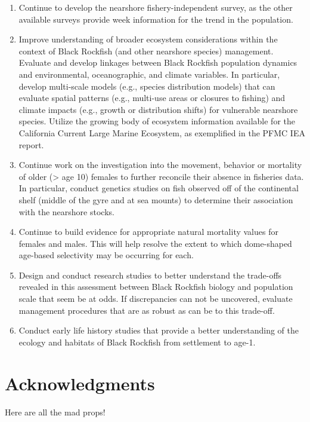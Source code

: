 \documentclass[11pt,
  english,
  letterpaper,
]{article}
\providecommand{\tightlist}{%
  \setlength{\itemsep}{0pt}\setlength{\parskip}{0pt}}
\providecommand{\tightlist}{%
  \setlength{\itemsep}{0pt}\setlength{\parskip}{0pt}}
\begin{document}
\begin{enumerate}
\def\labelenumi{\arabic{enumi}.}
\tightlist
\item
  Continue to develop the nearshore fishery-independent survey, as the other available surveys provide week information for the trend in the population.
\item
  Improve understanding of broader ecosystem considerations within the context of Black Rockfish (and other nearshore species) management. Evaluate and develop linkages between Black Rockfish population dynamics and environmental, oceanographic, and climate variables. In particular, develop multi-scale models (e.g., species distribution models) that can evaluate spatial patterns (e.g., multi-use areas or closures to fishing) and climate impacts (e.g., growth or distribution shifts) for vulnerable nearshore species. Utilize the growing body of ecosystem information available for the California Current Large Marine Ecosystem, as exemplified in the PFMC IEA report.
\item
  Continue work on the investigation into the movement, behavior or mortality of older (\textgreater{} age 10) females to further reconcile their absence in fisheries data. In particular, conduct genetics studies on fish observed off of the continental shelf (middle of the gyre and at sea mounts) to determine their association with the nearshore stocks.
\item
  Continue to build evidence for appropriate natural mortality values for females and males. This will help resolve the extent to which dome-shaped age-based selectivity may be occurring for each.
\item
  Design and conduct research studies to better understand the trade-offs revealed in this assessment between Black Rockfish biology and population scale that seem be at odds. If discrepancies can not be uncovered, evaluate management procedures that are as robust as can be to this trade-off.
\item
  Conduct early life history studies that provide a better understanding of the ecology and habitats of Black Rockfish from settlement to age-1.
\end{enumerate}

\hypertarget{acknowledgments}{%
\section{Acknowledgments}\label{acknowledgments}}

Here are all the mad props!
\end{document}
